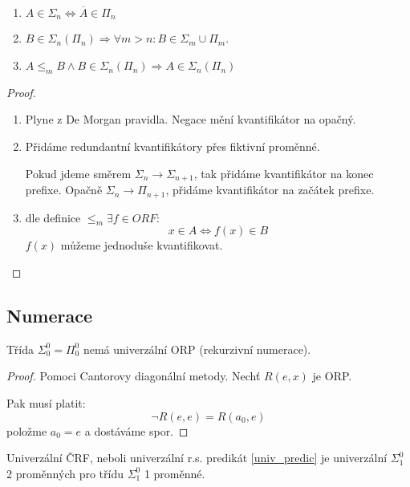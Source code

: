 \begin{theorem}\label{aritm_hier_prop}
	\begin{enumerate}
		\item $A \in \Sigma_n \iff \overline{A} \in \Pi_n$
		\item $B \in \Sigma_n (\Pi_n) \Rightarrow \forall m > n: B \in \Sigma_m \cup \Pi_m$.
		\item $A \leq_m B \land B \in \Sigma_n(\Pi_n) \Rightarrow A \in \Sigma_n(\Pi_n)$
	\end{enumerate}
\end{theorem}
\begin{proof}
	\begin{enumerate}
		\item Plyne z De Morgan pravidla. Negace mění kvantifikátor na opačný.
		\item Přidáme redundantní kvantifikátory přes fiktivní proměnné.

			Pokud jdeme směrem $\Sigma_n \to \Sigma_{n + 1}$, tak přidáme kvantifikátor na konec prefixe.
			Opačně $\Sigma_n \to \Pi_{n + 1}$, přidáme kvantifikátor na začátek prefixe.
		\item dle definice $\leq_m \exists f \in ORF$:
			\[ x \in A \iff f(x) \in B \]
			$f(x)$ můžeme jednoduše kvantifikovat.
	\end{enumerate}
\end{proof}

\subsection{Numerace}

\begin{theorem}
	Třída $\Sigma_0^0 = \Pi_0^0$ nemá univerzální ORP (rekurzivní numerace).
\end{theorem}
\begin{proof}
	Pomoci Cantorovy diagonální metody.
	Nechť $R(e, x)$ je ORP.

	Pak musí platit:
	\[ \neg R(e, e) = R(a_0, e) \]
	položme $a_0 = e$ a dostáváme spor.
\end{proof}

\begin{note}
	Univerzální ČRF, neboli univerzální r.s. predikát \cref{univ_predic} je univerzální $\Sigma_1^0$ 2 proměnných pro třídu $\Sigma_1^0$ 1 proměnné.
\end{note}

